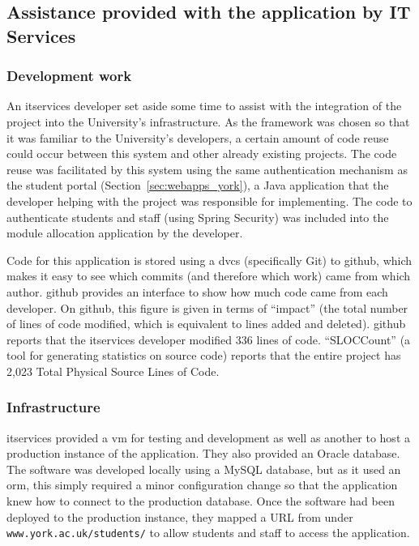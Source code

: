 
\subsection{Assistance provided with the application by IT Services}

\subsubsection{Development work}

An \gls{itservices} developer set aside some time to assist with the
integration of the project into the University's infrastructure. As the
framework was chosen so that it was familiar to the University's developers, a
certain amount of code reuse could occur between this system and other already
existing projects. The code reuse was facilitated by this system using the
same authentication mechanism as the student portal
(Section~\ref{sec:webapps_york}), a Java application that the developer
helping with the project was responsible for implementing. The code to
authenticate students and staff (using Spring Security) was included into the
module allocation application by the developer.

Code for this application is stored using a \gls{dvcs} (specifically Git) to
\gls{github}, which makes it easy to see which commits (and therefore which
work) came from which author. \gls{github} provides an interface to show how
much code came from each developer. On \gls{github}, this figure is given in
terms of ``impact'' (the total number of lines of code modified, which is
equivalent to lines added and deleted). \gls{github} reports that the
\gls{itservices} developer modified 336 lines of code. \mbox{``SLOCCount''}
\cite{SLOCCount} (a tool for generating statistics on source code) reports
that the entire project has 2,023 Total Physical Source Lines of Code.

\subsubsection{Infrastructure}

\gls{itservices} provided a \gls{vm} for testing and development as well as
another to host a production instance of the application. They also provided
an Oracle database. The software was developed locally using a MySQL database,
but as it used an \gls{orm}, this simply required a minor configuration change
so that the application knew how to connect to the production database. Once
the software had been deployed to the production instance, they mapped a URL
from under \texttt{www.york.ac.uk/students/} to allow students and staff to
access the application.

